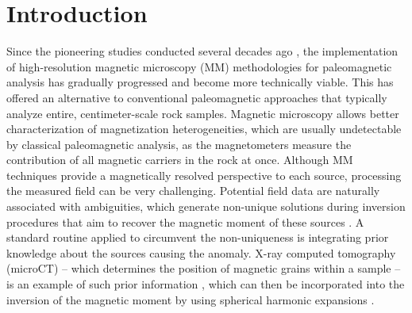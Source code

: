 \section{Introduction}

Since the pioneering studies conducted several decades ago \citep[\textit{e.g.,}][]{Thomas1992, Egli2000}, the implementation of high-resolution magnetic microscopy (MM) methodologies for paleomagnetic analysis has gradually progressed and become more technically viable. This has offered an alternative to conventional paleomagnetic approaches that typically analyze entire, centimeter-scale rock samples. Magnetic microscopy allows better characterization of magnetization heterogeneities, which are usually undetectable by classical paleomagnetic analysis, as the magnetometers measure the contribution of all magnetic carriers in the rock at once. Although MM techniques provide a magnetically resolved perspective to each source, processing the measured field can be very challenging. Potential field data are naturally associated with ambiguities, which generate non-unique solutions during inversion procedures that aim to recover the magnetic moment of these sources \citep{Blakely1996}. A standard routine applied to circumvent the non-uniqueness is integrating prior knowledge about the sources causing the anomaly. X-ray computed tomography (microCT) -- which determines the position of magnetic grains within a sample \citep{Fabian2019} -- is an example of such prior information \citep[\textit{e.g.}][]{DeGroot2018, DeGroot2021, Koster2023}, which can then be incorporated into the inversion of the magnetic moment by using spherical harmonic expansions \citep[\textit{e.g.}][]{CortesOrtuno2021, CortesOrtuno2022}.

